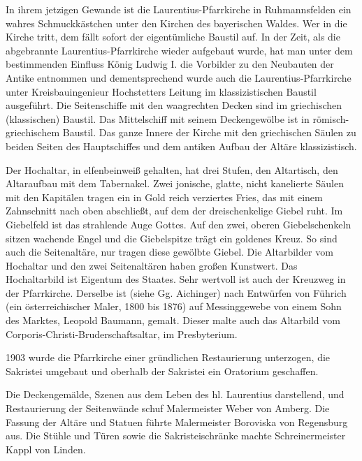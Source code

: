 \documentclass[12pt,a4paper]{book}
\begin{document}
In ihrem jetzigen Gewande ist die Laurentius-Pfarrkirche in Ruhmannsfelden ein
wahres Schmuckkästchen unter den Kirchen des bayerischen Waldes. Wer in die
Kirche tritt, dem fällt sofort der eigentümliche Baustil auf. In der Zeit, als
die abgebrannte Laurentius-Pfarrkirche wieder aufgebaut wurde, hat man unter dem
bestimmenden Einfluss König Ludwig I. die Vorbilder zu den Neubauten der Antike
entnommen und dementsprechend wurde auch die Laurentius-Pfarrkirche unter
Kreisbauingenieur Hochstetters Leitung im klassizistischen Baustil ausgeführt.
Die Seitenschiffe mit den waagrechten Decken sind im griechischen (klassischen)
Baustil. Das Mittelschiff mit seinem Deckengewölbe ist in römisch-griechischem
Baustil. Das ganze Innere der Kirche mit den griechischen Säulen zu beiden
Seiten des Hauptschiffes und dem antiken Aufbau der Altäre klassizistisch.

Der Hochaltar, in elfenbeinweiß gehalten, hat drei Stufen, den Altartisch, den
Altaraufbau mit dem Tabernakel. Zwei jonische, glatte, nicht kanelierte Säulen
mit den Kapitälen tragen ein in Gold reich verziertes Fries, das mit einem
Zahnschnitt nach oben abschließt, auf dem der dreischenkelige Giebel ruht. Im
Giebelfeld ist das strahlende Auge Gottes. Auf den zwei, oberen Giebelschenkeln
sitzen wachende Engel und die Giebelspitze trägt ein goldenes Kreuz. So sind
auch die Seitenaltäre, nur tragen diese gewölbte Giebel. Die Altarbilder vom
Hochaltar und den zwei Seitenaltären haben großen Kunstwert. Das Hochaltarbild
ist Eigentum des Staates. Sehr wertvoll ist auch der Kreuzweg in der
Pfarrkirche. Derselbe ist (siehe Gg. Aichinger) nach Entwürfen von Führich (ein
österreichischer Maler, 1800 bis 1876) auf Messinggewebe von einem Sohn des
Marktes, Leopold Baumann, gemalt. Dieser malte auch das Altarbild vom
Corporis-Christi-Bruderschaftsaltar, im Presbyterium.

1903 wurde die Pfarrkirche einer gründlichen Restaurierung unterzogen, die
Sakristei umgebaut und oberhalb der Sakristei ein Oratorium geschaffen.

Die Deckengemälde, Szenen aus dem Leben des hl. Laurentius darstellend, und
Restaurierung der Seitenwände schuf Malermeister Weber von Amberg. Die Fassung
der Altäre und Statuen führte Malermeister Boroviska von Regensburg aus. Die
Stühle und Türen sowie die Sakristeischränke machte Schreinermeister Kappl von
Linden.
\end{document}
